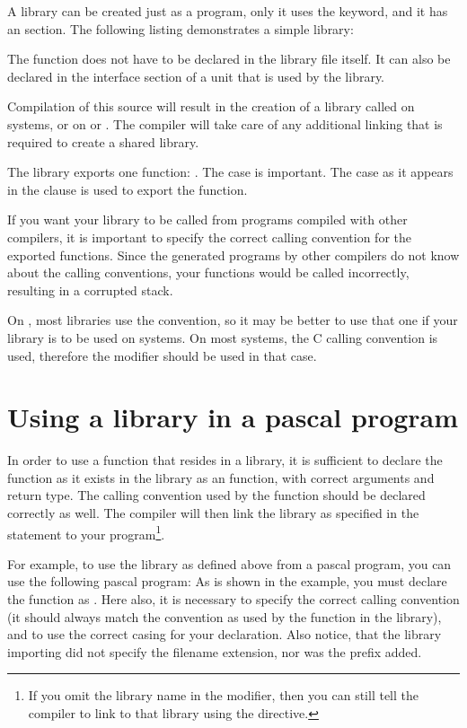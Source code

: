A library can be created just as a program, only it uses the 
keyword, and it has an  section. The following listing
demonstrates a simple library:


The function  does not have to be declared in the library file
itself. It can also be declared in the interface section of a unit that
is used by the library.

Compilation of this source will result in the creation of a library called
 on \unix systems, or  on \windows or \ostwo.
The compiler will take care of any additional linking that is required to create a
shared library.

The library exports one function: . The case is important. The
case as it appears in the  clause is used to export the
function.

If you want your library to be called from programs compiled with
other compilers, it is important to specify the correct calling
convention for the exported functions. Since the generated programs
by other compilers do not know about the \fpc calling conventions,
your functions would be called incorrectly, resulting in a corrupted
stack.


On \windows, most libraries use the  convention, so it may be
better to use that one if your library is to be used on \windows systems. On
most \unix systems, the C calling convention is used, therefore the
 modifier should be used in that case.

\section{Using a library in a pascal program}

In order to use a function that resides in a library, it is sufficient to
declare the function as it exists in the library as an 
function, with correct arguments and return type. The calling convention
used by the function should be declared correctly as well. The compiler
will then link the library as specified in the  statement
to your program\footnote{If you omit the library name in the 
modifier, then you can still tell the compiler to link to that library using
the  directive.}.

For example, to use the library as defined above from a pascal program, you can use
the following pascal program:
As is shown in the example, you must declare the function as .
Here also, it is necessary to specify the correct calling convention (it
should always match the convention as used by the function in the library),
and to use the correct casing for your declaration. Also notice, that
the library importing did not specify the filename extension, nor
was the  prefix added.

